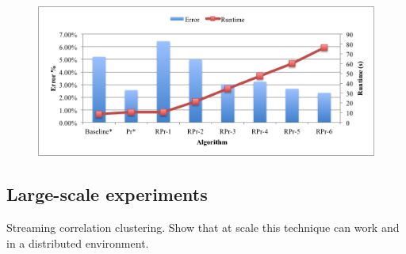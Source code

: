 \begin{figure}[t]\vspace{-1.8em}
\centering
\includegraphics[scale=0.5]{fig4.png}
\caption{}
\label{exp:ms-academic-ranking}
\end{figure}


\subsection{Large-scale experiments}
Streaming correlation clustering. Show that at scale this technique can work and in a distributed environment.


